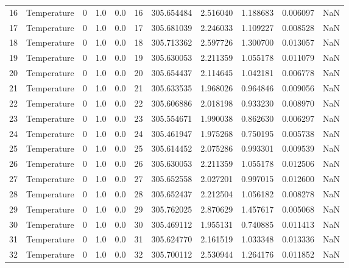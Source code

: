 \begin{tabular}{llrrrrrrrrr}
16  &  Temperature &       0 &  1.0 &  0.0 &   16 &  305.654484 &  2.516040 &  1.188683 &   0.006097 &      NaN \\
17  &  Temperature &       0 &  1.0 &  0.0 &   17 &  305.681039 &  2.246033 &  1.109227 &   0.008528 &      NaN \\
18  &  Temperature &       0 &  1.0 &  0.0 &   18 &  305.713362 &  2.597726 &  1.300700 &   0.013057 &      NaN \\
19  &  Temperature &       0 &  1.0 &  0.0 &   19 &  305.630053 &  2.211359 &  1.055178 &   0.011079 &      NaN \\
20  &  Temperature &       0 &  1.0 &  0.0 &   20 &  305.654437 &  2.114645 &  1.042181 &   0.006778 &      NaN \\
21  &  Temperature &       0 &  1.0 &  0.0 &   21 &  305.633535 &  1.968026 &  0.964846 &   0.009056 &      NaN \\
22  &  Temperature &       0 &  1.0 &  0.0 &   22 &  305.606886 &  2.018198 &  0.933230 &   0.008970 &      NaN \\
23  &  Temperature &       0 &  1.0 &  0.0 &   23 &  305.554671 &  1.990038 &  0.862630 &   0.006297 &      NaN \\
24  &  Temperature &       0 &  1.0 &  0.0 &   24 &  305.461947 &  1.975268 &  0.750195 &   0.005738 &      NaN \\
25  &  Temperature &       0 &  1.0 &  0.0 &   25 &  305.614452 &  2.075286 &  0.993301 &   0.009539 &      NaN \\
26  &  Temperature &       0 &  1.0 &  0.0 &   26 &  305.630053 &  2.211359 &  1.055178 &   0.012506 &      NaN \\
27  &  Temperature &       0 &  1.0 &  0.0 &   27 &  305.652558 &  2.027201 &  0.997015 &   0.012600 &      NaN \\
28  &  Temperature &       0 &  1.0 &  0.0 &   28 &  305.652437 &  2.212504 &  1.056182 &   0.008278 &      NaN \\
29  &  Temperature &       0 &  1.0 &  0.0 &   29 &  305.762025 &  2.870629 &  1.457617 &   0.005068 &      NaN \\
30  &  Temperature &       0 &  1.0 &  0.0 &   30 &  305.469112 &  1.955131 &  0.740885 &   0.011413 &      NaN \\
31  &  Temperature &       0 &  1.0 &  0.0 &   31 &  305.624770 &  2.161519 &  1.033348 &   0.013336 &      NaN \\
32  &  Temperature &       0 &  1.0 &  0.0 &   32 &  305.700112 &  2.530944 &  1.264176 &   0.011852 &      NaN \\

\end{tabular}
